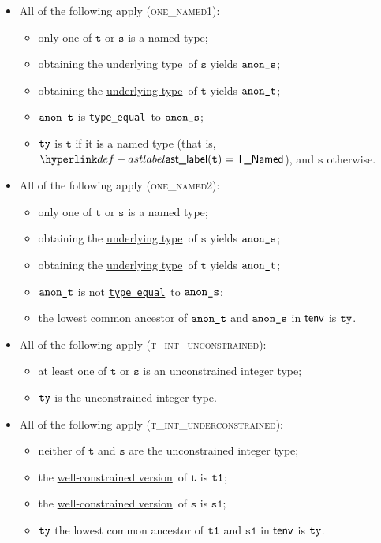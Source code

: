 \documentclass{book}
\newcommand\ProseOrTypeError[0]{\ProseTerminateAs{\TypeErrorConfig}}
\newcommand\typeequal[0]{\hyperlink{def-typeequal}{\texttt{type\_equal}}}
\newcommand\underlyingtype[0]{\hyperlink{def-underlyingtype}{underlying type}}
\newcommand\wellconstrainedversion[0]{\hyperlink{def-towellconstrained}{well-constrained version}}
\newcommand\vt[0]{\texttt{t}}
\newcommand\vs[0]{\texttt{s}}
\newcommand\vsone[0]{\texttt{s1}}
\begin{document}
\begin{itemize}
\begin{itemize}
    \item All of the following apply (\textsc{one\_named1}):
    \begin{itemize}
      \item only one of $\vt$ or $\vs$ is a named type;
      \item obtaining the \underlyingtype\ of $\vs$ yields $\texttt{anon\_s}$\ProseOrTypeError;
      \item obtaining the \underlyingtype\ of $\vt$ yields $\texttt{anon\_t}$\ProseOrTypeError;
      \item $\texttt{anon\_t}$ is \typeequal\ to $\texttt{anon\_s}$;
      \item $\texttt{ty}$ is $\vt$ if it is a named type (that is, $\astlabel(\vt)=\TNamed$), and $\vs$ otherwise.
    \end{itemize}

    \item All of the following apply (\textsc{one\_named2}):
    \begin{itemize}
      \item only one of $\vt$ or $\vs$ is a named type;
      \item obtaining the \underlyingtype\ of $\vs$ yields $\texttt{anon\_s}$\ProseOrTypeError;
      \item obtaining the \underlyingtype\ of $\vt$ yields $\texttt{anon\_t}$\ProseOrTypeError;
      \item $\texttt{anon\_t}$ is not \typeequal\ to $\texttt{anon\_s}$;
      \item the lowest common ancestor of $\texttt{anon\_t}$ and $\texttt{anon\_s}$ in $\textsf{tenv}$ is $\texttt{ty}$\ProseOrTypeError.
    \end{itemize}

    \item All of the following apply (\textsc{t\_int\_unconstrained}):
    \begin{itemize}
      \item at least one of $\vt$ or $\vs$ is an unconstrained integer type;
      \item $\texttt{ty}$ is the unconstrained integer type.
    \end{itemize}

    \item All of the following apply (\textsc{t\_int\_underconstrained}):
    \begin{itemize}
      \item neither of $\vt$ and $\vs$ are the unconstrained integer type;
      \item the \wellconstrainedversion\ of $\vt$ is $\texttt{t1}$;
      \item the \wellconstrainedversion\ of $\vs$ is $\vsone$;
      \item $\texttt{ty}$ the lowest common ancestor of $\texttt{t1}$ and $\vsone$ in $\textsf{tenv}$ is $\texttt{ty}$\ProseOrTypeError.
    \end{itemize}


\end{itemize}
\end{itemize}
\end{document}

